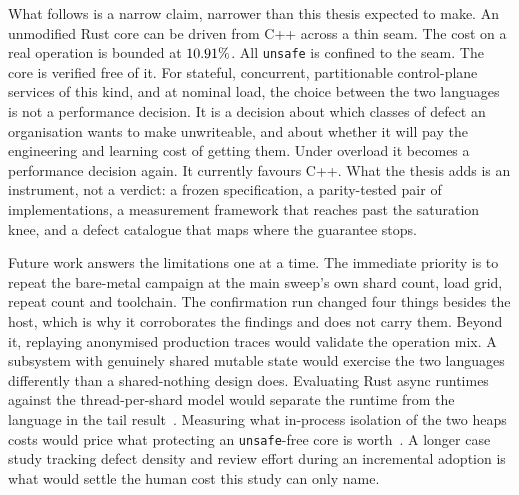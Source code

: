 \documentclass[english,twoside,openright,a4paper,censored,csm,software-track-2020]{HYthesisML}
\begin{document}
What follows is a narrow claim, narrower than this thesis expected to make. An unmodified
Rust core can be driven from C++ across a thin seam. The cost on a real operation is
bounded at $10.91\%$. All \texttt{unsafe} is confined to the seam. The core is
verified free of it. For stateful, concurrent, partitionable control-plane services of
this kind, and at nominal load, the choice between the two languages is not a performance
decision. It is a decision about which classes of defect an organisation wants to make
unwriteable, and about whether it will pay the engineering and learning cost of getting
them. Under overload it becomes a performance decision again. It currently favours C++.
What the thesis adds is an instrument, not a verdict: a frozen specification, a
parity-tested pair of implementations, a measurement framework that reaches past the
saturation knee, and a defect catalogue that maps where the guarantee stops.

Future work answers the limitations one at a time. The immediate priority is to repeat
the bare-metal campaign at the main sweep's own shard count, load grid, repeat count and
toolchain. The confirmation run changed four things besides the host, which is why it
corroborates the findings and does not carry them. Beyond it, replaying
anonymised production traces would validate the operation mix. A subsystem with
genuinely shared mutable state would exercise the two languages differently than a
shared-nothing design does. Evaluating Rust async runtimes against the thread-per-shard
model would separate the runtime from the language in the tail
result~\cite{arvidsson2025async}. Measuring what in-process isolation of the two heaps
costs would price what protecting an \texttt{unsafe}-free core is
worth~\cite{rivera2021galeed}. A longer case study tracking defect density and review
effort during an incremental adoption is what would settle the human cost this study can
only name.




\cleardoublepage %

\printbibliography
\end{document}
